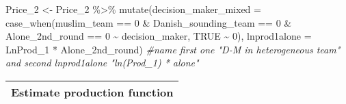 \documentclass[
]{article}
\newenvironment{Shaded}{\begin{snugshade}}{\end{snugshade}}
\newcommand{\AttributeTok}[1]{\textcolor[rgb]{0.77,0.63,0.00}{#1}}
\newcommand{\CommentTok}[1]{\textcolor[rgb]{0.56,0.35,0.01}{\textit{#1}}}
\newcommand{\ConstantTok}[1]{\textcolor[rgb]{0.00,0.00,0.00}{#1}}
\newcommand{\DecValTok}[1]{\textcolor[rgb]{0.00,0.00,0.81}{#1}}
\newcommand{\FunctionTok}[1]{\textcolor[rgb]{0.00,0.00,0.00}{#1}}
\newcommand{\NormalTok}[1]{#1}
\newcommand{\OtherTok}[1]{\textcolor[rgb]{0.56,0.35,0.01}{#1}}
\newcommand{\SpecialCharTok}[1]{\textcolor[rgb]{0.00,0.00,0.00}{#1}}
\begin{document}
\begin{Shaded}
\begin{Highlighting}[]
\NormalTok{Price\_2 }\OtherTok{\textless{}{-}}\NormalTok{ Price\_2 }\SpecialCharTok{\%\textgreater{}\%}
  \FunctionTok{mutate}\NormalTok{(}\AttributeTok{decision\_maker\_mixed =} \FunctionTok{case\_when}\NormalTok{(muslim\_team }\SpecialCharTok{==} \DecValTok{0} \SpecialCharTok{\&} 
\NormalTok{                                            Danish\_sounding\_team }\SpecialCharTok{==} \DecValTok{0} \SpecialCharTok{\&} 
\NormalTok{                                            Alone\_2nd\_round }\SpecialCharTok{==} \DecValTok{0} \SpecialCharTok{\textasciitilde{}} 
\NormalTok{                                            decision\_maker, }\ConstantTok{TRUE} \SpecialCharTok{\textasciitilde{}} \DecValTok{0}\NormalTok{),}
         \AttributeTok{lnprod1alone =}\NormalTok{ LnProd\_1 }\SpecialCharTok{*}\NormalTok{ Alone\_2nd\_round)}
\CommentTok{\#name first one "D{-}M in heterogeneous team" and second lnprod1alone "ln(Prod\_1) * alone"}
\end{Highlighting}
\end{Shaded}

\begin{longtable}[]{@{}c@{}}
\toprule
\endhead
Estimate production function \\
\bottomrule
\end{longtable}
\end{document}
